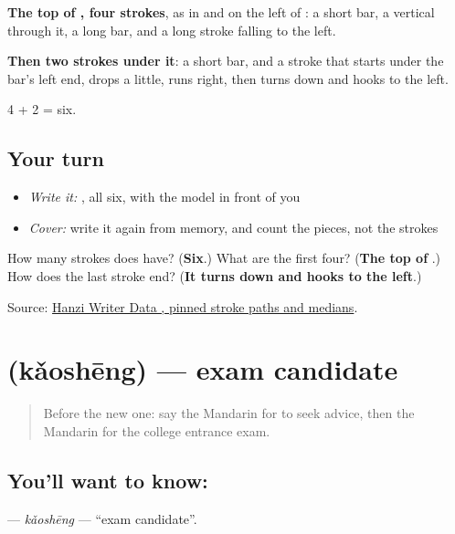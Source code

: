 \begin{quote}
\end{quote}

\textbf{The top of , four strokes}, as in  and on the left of : a short bar, a vertical through it, a long bar, and a long stroke falling to the left.

\textbf{Then two strokes under it}: a short bar, and a stroke that starts under the bar's left end, drops a little, runs right, then turns down and hooks to the left.

4 + 2 = six.

\subsection*{Your turn}
\begin{itemize}
\raggedright
  \item \emph{Write it:} , all six, with the model in front of you
  \item \emph{Cover:} write it again from memory, and count the pieces, not the strokes
\end{itemize}

\begin{tcolorbox}[breakable,colback=teal!4,colframe=teal!35!black,title={Before you move on}]
How many strokes does  have? (\textbf{Six}.) What are the first four? (\textbf{The top of }.) How does the last stroke end? (\textbf{It turns down and hooks to the left}.)

Source: \href{https://raw.githubusercontent.com/chanind/hanzi-writer-data/68d10a4b21150cae5e1ebbd223eed289cf32d90c/data/\%E8\%80\%83.json}{Hanzi Writer Data , pinned stroke paths and medians}.
\end{tcolorbox}
\section[\texorpdfstring{\zh{考生} (kǎoshēng)}{考生 (kǎoshēng)}]{ (kǎoshēng) — exam candidate}

\label{lesson:ZH-C494-kaosheng}



\begin{quote}
Before the new one: say the Mandarin for to seek advice, then the Mandarin for the college entrance exam.
\end{quote}

\subsection*{You'll want to know: }
\textbf{} — \emph{kǎoshēng} — \textquotedblleft{}exam candidate\textquotedblright{}.

